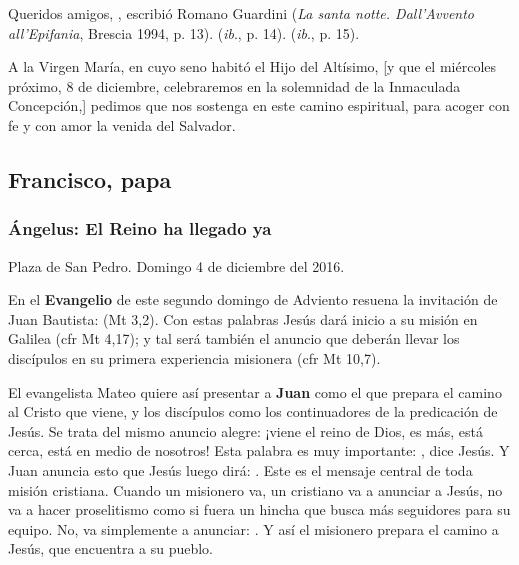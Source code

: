 Queridos amigos, , escribió Romano Guardini (\emph{La santa notte. Dall'Avvento all'Epifania}, Brescia 1994, p. 13).  (\emph{ib}., p. 14).  (\emph{ib}., p. 15).

A la Virgen María, en cuyo seno habitó el Hijo del Altísimo, {[}y que el miércoles próximo, 8 de diciembre, celebraremos en la solemnidad de la Inmaculada Concepción,{]} pedimos que nos sostenga en este camino espiritual, para acoger con fe y con amor la venida del Salvador.


\subsection{Francisco, papa}

\subsubsection{Ángelus: El Reino ha llegado ya}

Plaza de San Pedro. Domingo 4 de diciembre del 2016.

En el \textbf{Evangelio} de este segundo domingo de Adviento resuena la invitación de Juan Bautista:  (Mt 3,2). Con estas palabras Jesús dará inicio a su misión en Galilea (cfr Mt 4,17); y tal será también el anuncio que deberán llevar los discípulos en su primera experiencia misionera (cfr Mt 10,7).

El evangelista Mateo quiere así presentar a \textbf{Juan} como el que prepara el camino al Cristo que viene, y los discípulos como los continuadores de la predicación de Jesús. Se trata del mismo anuncio alegre: ¡viene el reino de Dios, es más, está cerca, está en medio de nosotros! Esta palabra es muy importante: , dice Jesús. Y Juan anuncia esto que Jesús luego dirá: . Este es el mensaje central de toda misión cristiana. Cuando un misionero va, un cristiano va a anunciar a Jesús, no va a hacer proselitismo como si fuera un hincha que busca más seguidores para su equipo. No, va simplemente a anunciar: . Y así el misionero prepara el camino a Jesús, que encuentra a su pueblo.

